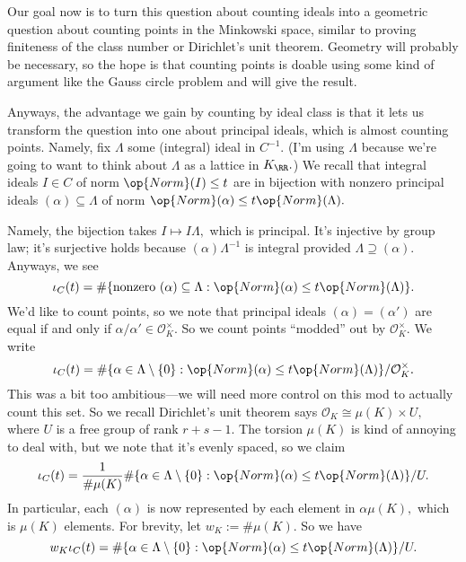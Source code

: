 Our goal now is to turn this question about counting ideals into a geometric question about counting points in the Minkowski space, similar to proving finiteness of the class number or Dirichlet's unit theorem. Geometry will probably be necessary, so the hope is that counting points is doable using some kind of argument like the Gauss circle problem and will give the result.

Anyways, the advantage we gain by counting by ideal class is that it lets us transform the question into one about principal ideals, which is almost counting points. Namely, fix $\Lambda$ some (integral) ideal in $C^{-1}.$ (I'm using $\Lambda$ because we're going to want to think about $\Lambda$ as a lattice in $K_\RR.$) We recall that integral ideals $I\in C$ of norm $\op{Norm}(I)\le t$ are in bijection with nonzero principal ideals $(\alpha)\subseteq\Lambda$ of norm $\op{Norm}(\alpha)\le t\op{Norm}(\Lambda).$

Namely, the bijection takes $I\mapsto I\Lambda,$ which is principal. It's injective by group law; it's surjective holds because $(\alpha)\Lambda^{-1}$ is integral provided $\Lambda\supseteq(\alpha).$ Anyways, we see
\[\iota_C(t)=\#\{\text{nonzero }(\alpha)\subseteq\Lambda:\op{Norm}(\alpha)\le t\op{Norm}(\Lambda)\}.\]
We'd like to count points, so we note that principal ideals $(\alpha)=(\alpha')$ are equal if and only if $\alpha/\alpha'\in\mathcal O_K^\times.$ So we count points ``modded'' out by $\mathcal O_K^\times.$ We write
\[\iota_C(t)=\#\{\alpha\in\Lambda\setminus\{0\}:\op{Norm}(\alpha)\le t\op{Norm}(\Lambda)\}/\mathcal O_K^\times.\]
This was a bit too ambitious---we will need more control on this mod to actually count this set. So we recall Dirichlet's unit theorem says $\mathcal O_K\cong\mu(K)\times U,$ where $U$ is a free group of rank $r+s-1.$ The torsion $\mu(K)$ is kind of annoying to deal with, but we note that it's evenly spaced, so we claim
\[\iota_C(t)=\frac1{\#\mu(K)}\#\{\alpha\in\Lambda\setminus\{0\}:\op{Norm}(\alpha)\le t\op{Norm}(\Lambda)\}/U.\]
In particular, each $(\alpha)$ is now represented by each element in $\alpha\mu(K),$ which is $\mu(K)$ elements. For brevity, let $w_K:=\#\mu(K).$ So we have
\[w_K\iota_C(t)=\#\{\alpha\in\Lambda\setminus\{0\}:\op{Norm}(\alpha)\le t\op{Norm}(\Lambda)\}/U.\]

